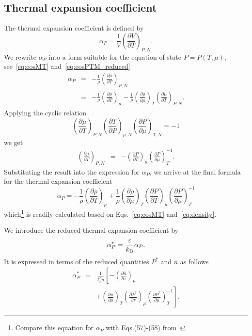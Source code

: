\subsection{Thermal expansion coefficient}
The thermal expansion coefficient is defined by
\begin{equation}
	\alpha_P = \frac{1}{V}\left(\frac{\partial V}{\partial T}\right)_{P,N}.
\end{equation}
We rewrite $\alpha_P$ into a form suitable for the equation of state $P=P(T,\mu)$, see~\eqref{eq:eosMT} and~\eqref{eq:eosPTM_reduced}
\begin{eqnarray}
	\label{eq:alpha_vs_rho}
	\alpha_P & = & -\frac{1}{\rho} \left(\frac{\partial \rho}{\partial T}\right)_{P, N}
	\\
	& = & -\frac{1}{\rho} \left(\frac{\partial \rho}{\partial T}\right)_{\mu} 
	- \frac{1}{\rho} \left(\frac{\partial \rho}{\partial \mu}\right)_{T}
	\left(\frac{\partial \mu}{\partial T}\right)_{P, N}.
\end{eqnarray}
Applying the cyclic relation
\begin{equation*}
	\left(\frac{\partial \mu}{\partial T}\right)_{P, N}
	\left(\frac{\partial T}{\partial P}\right)_{\mu, N}
	\left(\frac{\partial P}{\partial \mu}\right)_{T, N}
	= -1
\end{equation*}
we get
\begin{eqnarray*}
	\left(\frac{\partial \mu}{\partial T}\right)_{P, N} & = & 
	- \left(\frac{\partial P}{\partial T}\right)_{\mu}
	\left(\frac{\partial P}{\partial \mu}\right)^{-1}_{T}.
\end{eqnarray*}
Substituting the result into the expression for $\alpha_P$, we arrive at the final formula for the thermal expansion coefficient
\begin{equation}
	\label{eq:alphaP1}
	\alpha_P = -\frac{1}{\rho}\left(\frac{\partial \rho}{\partial T}\right)_{\mu}
	+ \frac{1}{\rho} \left(\frac{\partial \rho}{\partial \mu}\right)_{T}
	\left(\frac{\partial P}{\partial T}\right)_{\mu}
	\left(\frac{\partial P}{\partial \mu}\right)^{-1}_{T}
\end{equation}
which\footnote{Compare this equation for $\alpha_P$ with Eqs.(57)-(58) from~\cite{StrokerMeier2021}} is readily calculated based on Eqs.~\eqref{eq:eosMT} and~\eqref{eq:density}.

We introduce the reduced thermal expansion coefficient by
\begin{equation}
	\alpha^*_P = \frac{\varepsilon}{k_{\rm B}} \alpha_P.
\end{equation}
It is expressed in terms of the reduced quantities $P^*$ and $\bar{n}$ as follows
\begin{eqnarray}
	\alpha^*_P & = & \frac{1}{T^*_c \bar{n}}
	\left[ 
	-\left(\frac{\partial \bar{n}}{\partial \tau}\right)_{\mu}
	\right. \nonumber\\
	&& + \left.\left(\frac{\partial \bar{n}}{\partial \mu}\right)_{T}
	\left(\frac{\partial P^*}{\partial \tau}\right)_{\mu}
	\left(\frac{\partial P^*}{\partial \mu}\right)^{-1}_{T} 
	\right].
\end{eqnarray}

